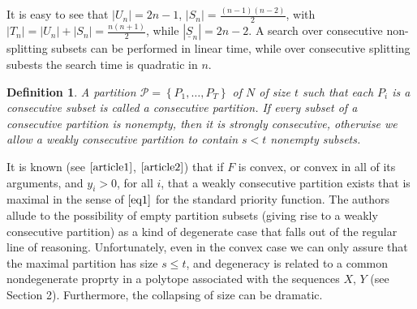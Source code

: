 \documentclass{article}
\newtheorem{definition}{Definition}
\theoremstyle{case}
\begin{document}
It is easy to see that $| U_n | = 2n - 1$, $| S_n | = \frac{(n-1)(n-2)}{2}$, with $| T_n | = | U_n | + | S_n | = \frac{n(n+1)}{2}$, while $| \underline{S}_n | = 2n - 2$. A search over consecutive non-splitting subsets can be performed in linear time, while over consecutive splitting subests the search time is quadratic in $n$.

\begin{definition}
A partition $\mathcal{P} = \left\lbrace P_1, \dots, P_T\right\rbrace$ of $N$ of size $t$ such that each $P_i$ is a consecutive subset is called a consecutive partition. If every subset of a consecutive partition is nonempty, then it is strongly consecutive, otherwise we allow a weakly consecutive partition to contain $s < t$ nonempty subsets.
\end{definition}

It is known (see $\cite{article1}$, $\cite{article2}$) that if $F$ is convex, or convex in all of its arguments, and $y_i > 0$, for all $i$, that a weakly consecutive partition exists that is maximal in the sense of $\ref{eq1}$ for the standard priority function. The authors allude to the possibility of empty partition subsets (giving rise to a weakly consecutive partition) as a kind of degenerate case that falls out of the regular line of reasoning. Unfortunately, even in the convex case we can only assure that the maximal partition has size $s \leq t$, and degeneracy is related to a common nondegenerate proprty in a polytope associated with the sequences $X$, $Y$ (see Section 2). Furthermore, the collapsing of size can be dramatic.

\vspace{4pt}
\end{document}
